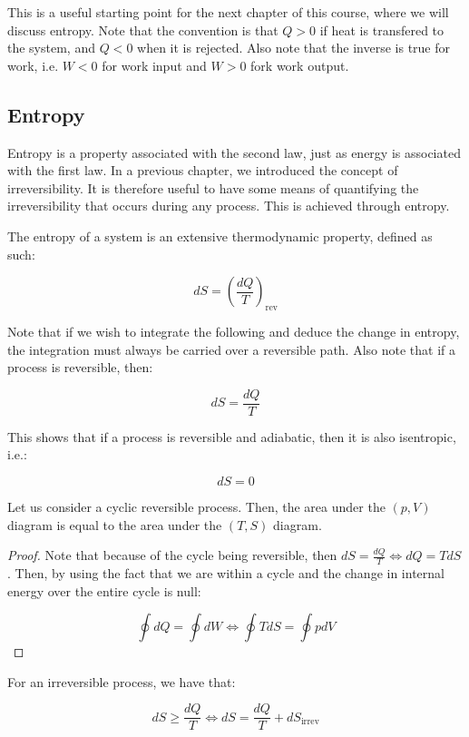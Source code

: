 \documentclass{article}
\begin{document}
This is a useful starting point for the next chapter of this course, where we will discuss entropy. Note that the convention is that $Q > 0$ if heat is transfered to the system, and $Q < 0$ when it is rejected. Also note that the inverse is true for work, i.e. $W < 0$ for work input and $W > 0$ fork work output.

\newpage

\subsection{Entropy}

Entropy is a property associated with the second law, just as energy is associated with the first law. In a previous chapter, we introduced the concept of irreversibility. It is therefore useful to have some means of quantifying the irreversibility that occurs during any process. This is achieved through entropy.

\begin{definition}[Entropy]
    The entropy of a system is an extensive thermodynamic property, defined as such:

    \[ dS = \left(\frac{dQ}{T}\right)_{\text{rev}} \]
\end{definition}

Note that if we wish to integrate the following and deduce the change in entropy, the integration must always be carried over a reversible path. Also note that if a process is reversible, then:

\[ dS = \frac{dQ}{T} \]

This shows that if a process is reversible and adiabatic, then it is also isentropic, i.e.:

\[ dS = 0 \]

\begin{proposition}
    Let us consider a cyclic reversible process. Then, the area under the $(p, V)$ diagram is equal to the area under the $(T, S)$ diagram.
\end{proposition}

\begin{proof}
    Note that because of the cycle being reversible, then $dS = \frac{dQ}{T} \iff dQ = TdS$. Then, by using the fact that we are within a cycle and the change in internal energy over the entire cycle is null:

    \[ \oint dQ = \oint dW \iff \oint TdS = \oint pdV \]
\end{proof}

\begin{proposition}
    For an irreversible process, we have that:

    \[ dS \geq \frac{dQ}{T} \iff dS = \frac{dQ}{T} + dS_{\text{irrev}} \]
\end{proposition}
\end{document}
